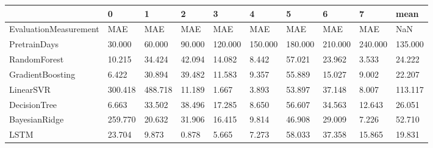 \begin{tabular}{llllllllll}
\toprule
{} &       0 &       1 &      2 &       3 &       4 &       5 &       6 &       7 &    mean \\
\midrule
EvaluationMeasurement &     MAE &     MAE &    MAE &     MAE &     MAE &     MAE &     MAE &     MAE &     NaN \\
PretrainDays          &  30.000 &  60.000 & 90.000 & 120.000 & 150.000 & 180.000 & 210.000 & 240.000 & 135.000 \\
RandomForest          &  10.215 &  34.424 & 42.094 &  14.082 &   8.442 &  57.021 &  23.962 &   3.533 &  24.222 \\
GradientBoosting      &   6.422 &  30.894 & 39.482 &  11.583 &   9.357 &  55.889 &  15.027 &   9.002 &  22.207 \\
LinearSVR             & 300.418 & 488.718 & 11.189 &   1.667 &   3.893 &  53.897 &  37.148 &   8.007 & 113.117 \\
DecisionTree          &   6.663 &  33.502 & 38.496 &  17.285 &   8.650 &  56.607 &  34.563 &  12.643 &  26.051 \\
BayesianRidge         & 259.770 &  20.632 & 31.906 &  16.415 &   9.814 &  46.908 &  29.009 &   7.226 &  52.710 \\
LSTM                  &  23.704 &   9.873 &  0.878 &   5.665 &   7.273 &  58.033 &  37.358 &  15.865 &  19.831 \\
\bottomrule
\end{tabular}

